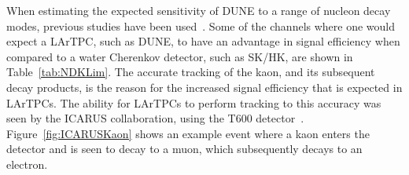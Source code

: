 When estimating the expected sensitivity of DUNE to a range of nucleon decay modes, previous studies have been used~\citep{Bueno, Klinger:2015kva}. Some of the channels where one would expect a LArTPC, such as DUNE, to have an advantage in signal efficiency when compared to a water Cherenkov detector, such as SK/HK, are shown in Table~\ref{tab:NDKLim}. The accurate tracking of the kaon, and its subsequent decay products, is the reason for the increased signal efficiency that is expected in LArTPCs. The ability for LArTPCs to perform tracking to this accuracy was seen by the ICARUS collaboration, using the T600 detector~\citep{PMTrack}. Figure~\ref{fig:ICARUSKaon} shows an example event where a kaon enters the detector and is seen to decay to a muon, which subsequently decays to an electron. \\

